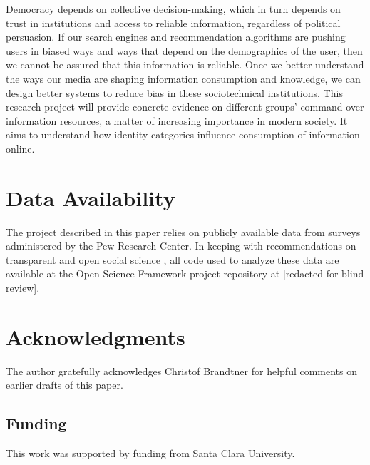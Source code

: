 \documentclass[11pt]{article}
\begin{document}
Democracy depends on collective decision-making, which in turn depends on trust
in institutions and access to reliable information, regardless of political
persuasion. If our search engines and recommendation algorithms are pushing
users in biased ways and ways that depend on the demographics of the user, then
we cannot be assured that this information is reliable. Once we better
understand the ways our media are shaping information consumption and knowledge,
we can design better systems to reduce bias in these sociotechnical
institutions. This research project will provide concrete evidence on different
groups' command over information resources, a matter of increasing importance in
modern society. It aims to understand how identity categories influence
consumption of information online.




\hypertarget{data-availability}{%
\section{Data Availability}\label{sec:data-availability}}

The project described in this paper relies on publicly available data from
surveys administered by the Pew Research Center.
In keeping with recommendations on transparent and open social science
\citep{Freese2018}, all code used to analyze these data are available at the
Open Science Framework project repository at [redacted for blind review].

\newpage
\hypertarget{acknowledgments}{%
\section{Acknowledgments}\label{sec:acknowledgments}}

The author gratefully acknowledges Christof Brandtner for helpful comments on
earlier drafts of this paper.


\hypertarget{funding}{%
\subsection{Funding}\label{sec:funding}}
This work was supported by funding from Santa Clara University.
\end{document}
